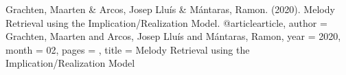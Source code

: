 Grachten, Maarten & Arcos, Josep Lluís & Mántaras, Ramon. (2020). Melody Retrieval using the Implication/Realization Model. 
@article{article,
author = {Grachten, Maarten and Arcos, Josep Lluís and Mántaras, Ramon},
year = {2020},
month = {02},
pages = {},
title = {Melody Retrieval using the Implication/Realization Model}
}